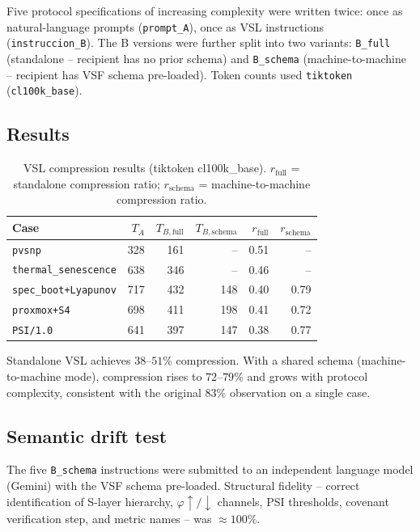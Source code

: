 Five protocol specifications of increasing complexity were written twice:
once as natural-language prompts (\texttt{prompt\_A}), once as VSL
instructions (\texttt{instruccion\_B}).
The B versions were further split into two variants:
\texttt{B\_full} (standalone -- recipient has no prior schema)
and \texttt{B\_schema} (machine-to-machine -- recipient has VSF schema
pre-loaded).
Token counts used \texttt{tiktoken} (\texttt{cl100k\_base}).

\subsection{Results}

\begin{table}[h]
\centering
\caption{VSL compression results (tiktoken cl100k\_base).
  $r_\text{full}$ = standalone compression ratio;
  $r_\text{schema}$ = machine-to-machine compression ratio.}
\label{tab:vsl}
\begin{tabular}{lrrrrr}
\hline
Case & $T_A$ & $T_{B,\text{full}}$ & $T_{B,\text{schema}}$
     & $r_\text{full}$ & $r_\text{schema}$ \\
\hline
\texttt{pvsnp}               & 328 & 161 &  --  & 0.51 &  --  \\
\texttt{thermal\_senescence} & 638 & 346 &  --  & 0.46 &  --  \\
\texttt{spec\_boot+Lyapunov} & 717 & 432 & 148  & 0.40 & 0.79 \\
\texttt{proxmox+S4}          & 698 & 411 & 198  & 0.41 & 0.72 \\
\texttt{PSI/1.0}             & 641 & 397 & 147  & 0.38 & 0.77 \\
\hline
\end{tabular}
\end{table}

Standalone VSL achieves $38$--$51\%$ compression.
With a shared schema (machine-to-machine mode), compression rises to
$72$--$79\%$ and grows with protocol complexity, consistent with the
original $83\%$ observation on a single case.

\subsection{Semantic drift test}

The five \texttt{B\_schema} instructions were submitted to an independent
language model (Gemini) with the VSF schema pre-loaded.
Structural fidelity -- correct identification of S-layer hierarchy,
$\varphi\!\uparrow/\!\downarrow$ channels, PSI thresholds, covenant
verification step, and metric names -- was $\approx 100\%$.

